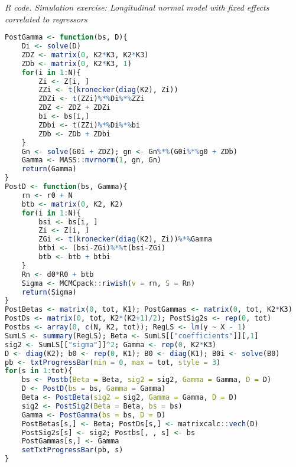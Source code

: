 \begin{enumerate}[leftmargin=*]
\begin{tcolorbox}[enhanced,width=4.67in,center upper,
	fontupper=\large\bfseries,drop shadow southwest,sharp corners]
	\textit{R code. Simulation exercise: Longitudinal normal model with fixed effects correlated to regressors}
	\begin{VF}
		\begin{lstlisting}[language=R]
PostGamma <- function(bs, D){
	Di <- solve(D)
	ZDZ <- matrix(0, K2*K3, K2*K3)
	ZDb <- matrix(0, K2*K3, 1)
	for(i in 1:N){
		Zi <- Z[i, ]
		ZZi <- t(kronecker(diag(K2), Zi))
		ZDZi <- t(ZZi)%*%Di%*%ZZi
		ZDZ <- ZDZ + ZDZi
		bi <- bs[i,]
		ZDbi <- t(ZZi)%*%Di%*%bi
		ZDb <- ZDb + ZDbi
	}
	Gn <- solve(G0i + ZDZ); gn <- Gn%*%(G0i%*%g0 + ZDb)
	Gamma <- MASS::mvrnorm(1, gn, Gn)
	return(Gamma)
}
PostD <- function(bs, Gamma){
	rn <- r0 + N
	btb <- matrix(0, K2, K2)
	for(i in 1:N){
		bsi <- bs[i, ]
		Zi <- Z[i, ]
		ZGi <- t(kronecker(diag(K2), Zi))%*%Gamma
		btbi <- (bsi-ZGi)%*%t(bsi-ZGi)
		btb <- btb + btbi
	}
	Rn <- d0*R0 + btb
	Sigma <- MCMCpack::riwish(v = rn, S = Rn)
	return(Sigma)
}
PostBetas <- matrix(0, tot, K1); PostGammas <- matrix(0, tot, K2*K3)
PostDs <- matrix(0, tot, K2*(K2+1)/2); PostSig2s <- rep(0, tot)
Postbs <- array(0, c(N, K2, tot)); RegLS <- lm(y ~ X - 1)
SumLS <- summary(RegLS); Beta <- SumLS[["coefficients"]][,1]
sig2 <- SumLS[["sigma"]]^2; Gamma <- rep(0, K2*K3)
D <- diag(K2); b0 <- rep(0, K1); B0 <- diag(K1); B0i <- solve(B0) 
pb <- txtProgressBar(min = 0, max = tot, style = 3)
for(s in 1:tot){
	bs <- Postb(Beta = Beta, sig2 = sig2, Gamma = Gamma, D = D)
	D <- PostD(bs = bs, Gamma = Gamma)
	Beta <- PostBeta(sig2 = sig2, Gamma = Gamma, D = D)
	sig2 <- PostSig2(Beta = Beta, bs = bs)
	Gamma <- PostGamma(bs = bs, D = D) 
	PostBetas[s,] <- Beta; PostDs[s,] <- matrixcalc::vech(D)
	PostSig2s[s] <- sig2; Postbs[, , s] <- bs
	PostGammas[s,] <- Gamma
	setTxtProgressBar(pb, s)
}
\end{lstlisting}
	\end{VF}
\end{tcolorbox}


\end{enumerate}
